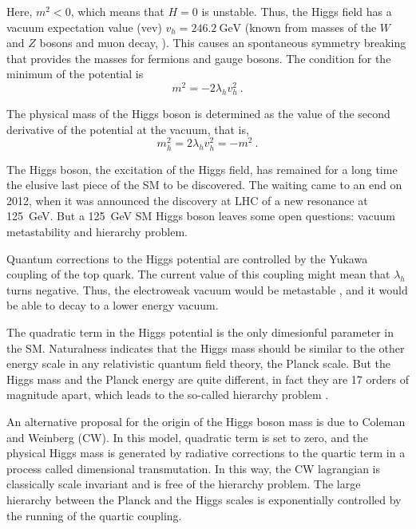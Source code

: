 \documentclass[aps,prd,preprintnumbers,nofootinbibn,twocolumn]{revtex4}
\begin{document}
Here, $m^2 < 0$, which means that $H=0$ is unstable. Thus, the Higgs field has a vacuum expectation value (vev) $v_h=\SI{246.2}{\giga\electronvolt}$ (known from masses of the $W$ and $Z$ bosons and muon decay, \cite{Agashe:2014kda}). This causes an spontaneous symmetry breaking that provides the masses for fermions and gauge bosons. The condition for the minimum of the potential is 
\begin{equation}
m^2 = -2\lambda_h v_h^2\ .
\end{equation}

The physical mass of the Higgs boson is determined as the value of the second derivative of the potential at the vacuum, that is, 
\begin{equation}
m_h^2 = 2 \lambda_h v_h^2=-m^2\ .
\end{equation}

The Higgs boson, the excitation of the Higgs field, has remained for a long time the elusive last piece of the SM to be discovered. The waiting came to an end on 2012, when it was announced the discovery at LHC \cite{Aad:2012tfa,Chatrchyan:2012xdj} of a new resonance at \SI{125}{\giga\electronvolt}. But a \SI{125}{\giga\electronvolt} SM Higgs boson leaves some open questions: vacuum metastability and hierarchy problem.
 
Quantum corrections to the Higgs potential are controlled by the Yukawa coupling of the top quark. The current value of this coupling might mean that $\lambda_h$ turns negative. Thus, the electroweak vacuum would be metastable \cite{EliasMiro:2011aa}, and it would be able to decay to a lower energy vacuum.

The quadratic term in the Higgs potential is the only dimesionful parameter in the SM. Naturalness indicates that the Higgs mass should be similar to the other energy scale in any relativistic quantum field theory, the Planck scale. But the Higgs mass and the Planck energy are quite different, in fact they are 17 orders of magnitude apart, which leads to the so-called hierarchy problem \cite{Iso:2013aqa}. 

An alternative proposal for the origin of the Higgs boson mass is due to Coleman and Weinberg \cite{Coleman:1973jx} (CW). In this model, quadratic term is set to zero, and the physical Higgs mass is generated by radiative corrections to the quartic term in a process called dimensional transmutation. In this way, the CW lagrangian is classically scale invariant and is free of the hierarchy problem. The large hierarchy between the Planck and the Higgs scales is exponentially controlled by the running of the quartic coupling. 
\end{document}
